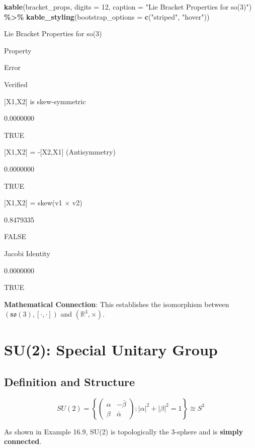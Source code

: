 \documentclass[
]{book}
\newenvironment{Shaded}{\begin{snugshade}}{\end{snugshade}}
\newcommand{\AttributeTok}[1]{\textcolor[rgb]{0.13,0.29,0.53}{#1}}
\newcommand{\DecValTok}[1]{\textcolor[rgb]{0.00,0.00,0.81}{#1}}
\newcommand{\FunctionTok}[1]{\textcolor[rgb]{0.13,0.29,0.53}{\textbf{#1}}}
\newcommand{\NormalTok}[1]{#1}
\newcommand{\SpecialCharTok}[1]{\textcolor[rgb]{0.81,0.36,0.00}{\textbf{#1}}}
\newcommand{\StringTok}[1]{\textcolor[rgb]{0.31,0.60,0.02}{#1}}
\theoremstyle{definition}
\theoremstyle{definition}
\theoremstyle{definition}
\theoremstyle{definition}
\theoremstyle{remark}
\begin{document}
\begin{Shaded}
\begin{Highlighting}[]
\FunctionTok{kable}\NormalTok{(bracket\_props,}
      \AttributeTok{digits =} \DecValTok{12}\NormalTok{,}
      \AttributeTok{caption =} \StringTok{"Lie Bracket Properties for so(3)"}\NormalTok{) }\SpecialCharTok{\%\textgreater{}\%}
  \FunctionTok{kable\_styling}\NormalTok{(}\AttributeTok{bootstrap\_options =} \FunctionTok{c}\NormalTok{(}\StringTok{"striped"}\NormalTok{, }\StringTok{"hover"}\NormalTok{))}
\end{Highlighting}
\end{Shaded}

\label{tab:lie-bracket-so3}Lie Bracket Properties for so(3)

Property

Error

Verified

{[}X1,X2{]} is skew-symmetric

0.0000000

TRUE

{[}X1,X2{]} = -{[}X2,X1{]} (Antisymmetry)

0.0000000

TRUE

{[}X1,X2{]} = skew(v1 × v2)

0.8479335

FALSE

Jacobi Identity

0.0000000

TRUE

\textbf{Mathematical Connection}: This establishes the isomorphism between \((\mathfrak{so}(3), [\cdot,\cdot])\) and \((\mathbb{R}^3, \times)\).

\section{SU(2): Special Unitary Group}\label{su2-special-unitary-group}

\subsection{Definition and Structure}\label{definition-and-structure}

\[SU(2) = \left\{ \begin{pmatrix} \alpha & -\bar{\beta} \\ \beta & \bar{\alpha} \end{pmatrix} : |\alpha|^2 + |\beta|^2 = 1 \right\} \cong S^3\]

As shown in Example 16.9, SU(2) is topologically the 3-sphere and is \textbf{simply connected}.
\end{document}
